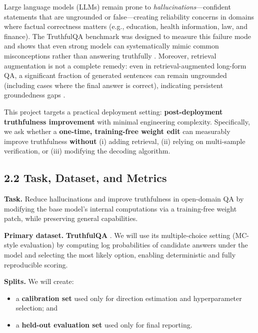 Large language models (LLMs) remain prone to \textit{hallucinations}—confident statements that are ungrounded or false—creating reliability concerns in domains where factual correctness matters (e.g., education, health information, law, and finance). The TruthfulQA benchmark was designed to measure this failure mode and shows that even strong models can systematically mimic common misconceptions rather than answering truthfully \citep{lin2022truthfulqa}. Moreover, retrieval augmentation is not a complete remedy: even in retrieval-augmented long-form QA, a significant fraction of generated sentences can remain ungrounded (including cases where the final answer is correct), indicating persistent groundedness gaps \citep{stolfo2024groundedness}.

This project targets a practical deployment setting: \textbf{post-deployment truthfulness improvement} with minimal engineering complexity. Specifically, we ask whether a \textbf{one-time, training-free weight edit} can measurably improve truthfulness \textbf{without} (i) adding retrieval, (ii) relying on multi-sample verification, or (iii) modifying the decoding algorithm.


\subsection*{2.2 Task, Dataset, and Metrics}

\textbf{Task.} Reduce hallucinations and improve truthfulness in open-domain QA by modifying the base model’s internal computations via a training-free weight patch, while preserving general capabilities.

\textbf{Primary dataset.} \textbf{TruthfulQA} \citep{lin2022truthfulqa}. We will use its multiple-choice setting (MC-style evaluation) by computing log probabilities of candidate answers under the model and selecting the most likely option, enabling deterministic and fully reproducible scoring.

\textbf{Splits.} We will create:
\begin{itemize}
  \item a \textbf{calibration set} used only for direction estimation and hyperparameter selection; and
  \item a \textbf{held-out evaluation set} used only for final reporting.
\end{itemize}

